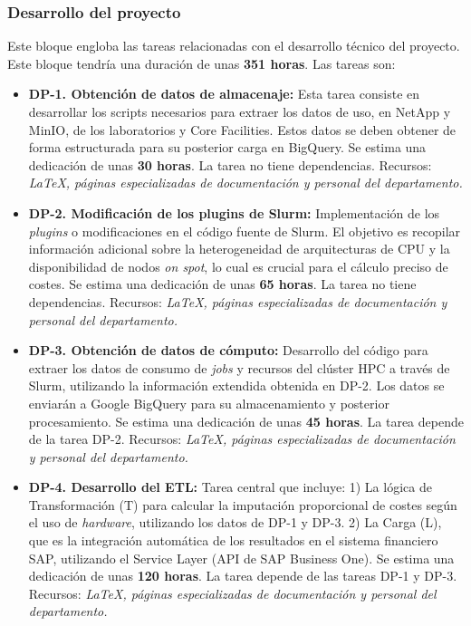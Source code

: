 \subsubsection{Desarrollo del proyecto}
Este bloque engloba las tareas relacionadas con el desarrollo técnico del proyecto. Este bloque
tendría una duración de unas \textbf{351 horas}. Las tareas son:
\begin{itemize}
    \item \textbf{DP-1. Obtención de datos de almacenaje:} Esta tarea consiste en desarrollar 
    los scripts necesarios para extraer los datos de uso, en NetApp y MinIO, de los laboratorios
    y Core Facilities. Estos datos se deben obtener de forma estructurada para su posterior carga 
    en BigQuery. Se estima una dedicación de unas \textbf{30 horas}.
    \newline La tarea no tiene dependencias.
    \newline Recursos: \textit {LaTeX, páginas especializadas de documentación y personal del departamento.}
    
    \item \textbf{DP-2. Modificación de los plugins de Slurm:} Implementación de los \textit{plugins} o modificaciones  en el código fuente de Slurm. 
    El objetivo es recopilar información adicional 
    sobre la heterogeneidad de arquitecturas de CPU y la disponibilidad de nodos \textit{on spot}, lo cual es crucial para el cálculo preciso de costes. 
    Se estima una dedicación de unas \textbf{65 horas}.
    \newline La tarea no tiene dependencias.
    \newline Recursos: \textit {LaTeX, páginas especializadas de documentación y personal del departamento.}
    
    \item \textbf{DP-3. Obtención de datos de cómputo:} Desarrollo del código para extraer los datos de consumo de \textit{jobs} y recursos del clúster HPC 
    a través de Slurm, utilizando la información extendida obtenida en DP-2. Los datos se enviarán a Google BigQuery para su almacenamiento 
    y posterior procesamiento. Se estima una dedicación de unas \textbf{45 horas}.
    \newline La tarea depende de la tarea DP-2.
    \newline Recursos: \textit {LaTeX, páginas especializadas de documentación y personal del departamento.}
    
    \item \textbf{DP-4. Desarrollo del ETL:}  Tarea central que incluye: 1) La lógica de Transformación (T) para calcular la imputación proporcional de costes 
    según el uso de \textit{hardware}, utilizando los datos de DP-1 y DP-3. 2) La Carga (L), que es la integración automática de los resultados en el sistema 
    financiero SAP, utilizando el Service Layer (API de SAP Business One). Se estima una dedicación de unas \textbf{120 horas}.
    \newline La tarea depende de las tareas DP-1 y DP-3.
    \newline Recursos: \textit {LaTeX, páginas especializadas de documentación y personal del departamento.}
    

\end{itemize}
